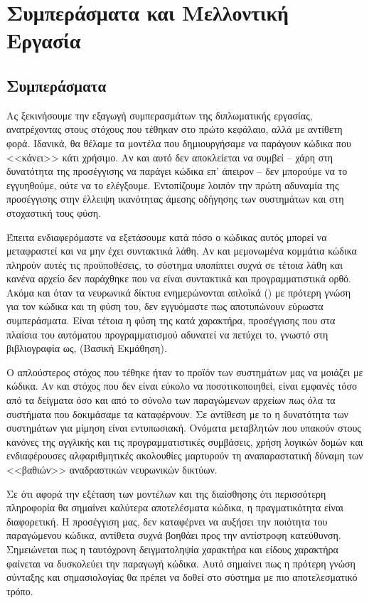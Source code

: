 \chapter{Συμπεράσματα και Μελλοντική Εργασία}

\section{Συμπεράσματα}

Ας ξεκινήσουμε την εξαγωγή συμπερασμάτων της διπλωματικής εργασίας, ανατρέχοντας στους στόχους που τέθηκαν στο πρώτο κεφάλαιο, αλλά με αντίθετη φορά.
Ιδανικά, θα θέλαμε τα μοντέλα που δημιουργήσαμε να παράγουν κώδικα που <<κάνει>> κάτι χρήσιμο. Αν και αυτό δεν αποκλείεται να συμβεί -- χάρη στη δυνατότητα της προσέγγισης να παράγει κώδικα  επ' άπειρον -- δεν μπορούμε να το εγγυηθούμε, ούτε να το ελέγξουμε.
Εντοπίζουμε λοιπόν την πρώτη αδυναμία της προσέγγισης στην έλλειψη ικανότητας άμεσης οδήγησης των συστημάτων και στη στοχαστική τους φύση.

Έπειτα ενδιαφερόμαστε να εξετάσουμε κατά πόσο ο κώδικας αυτός μπορεί να μεταφραστεί και να μην έχει συντακτικά λάθη.
Αν και μεμονωμένα κομμάτια κώδικα πληρούν αυτές τις προϋποθέσεις, το σύστημα υποπίπτει συχνά σε τέτοια λάθη και κανένα αρχείο δεν παράχθηκε που να είναι συντακτικά και προγραμματιστικά ορθό. 
Ακόμα και όταν τα νευρωνικά δίκτυα ενημερώνονται απλοϊκά () με πρότερη γνώση για τον κώδικα και τη φύση του, δεν εγγυόμαστε πως αποτυπώνουν εύρωστα συμπεράσματα.
Είναι τέτοια η φύση της κατά χαρακτήρα,  προσέγγισης που στα πλαίσια του αυτόματου προγραμματισμού αδυνατεί να πετύχει το, γνωστό στη βιβλιογραφία ως, (Βασική Εκμάθηση).

Ο απλούστερος στόχος που τέθηκε ήταν το προϊόν των συστημάτων μας να μοιάζει με κώδικα. Αν και στόχος που δεν είναι εύκολο να ποσοτικοποιηθεί, είναι εμφανές τόσο από τα δείγματα όσο και από το σύνολο των παραγώμενων αρχείων πως όλα τα συστήματα που δοκιμάσαμε τα καταφέρνουν. 
Σε αντίθεση με το  η δυνατότητα των συστημάτων για μίμηση είναι εντυπωσιακή.
Ονόματα μεταβλητών που υπακούν στους κανόνες της αγγλικής και τις προγραμματιστικές συμβάσεις, χρήση λογικών δομών και ενδιαφέρουσες αλφαριθμητικές ακολουθίες μαρτυρούν τη αναπαραστατική δύναμη των <<βαθιών>> αναδραστικών νευρωνικών δικτύων.

Σε ότι αφορά την εξέταση των  μοντέλων και της διαίσθησης ότι περισσότερη πληροφορία θα σημαίνει καλύτερα αποτελέσματα κώδικα, η πραγματικότητα είναι διαφορετική.
Η προσέγγιση μας, δεν καταφέρνει να αυξήσει την ποιότητα του παραγώμενου κώδικα, αντίθετα συχνά βοηθάει προς την αντίστροφη κατεύθυνση.
Σημειώνεται πως η ταυτόχρονη δειγματοληψία χαρακτήρα και είδους χαρακτήρα φαίνεται να δυσκολεύει την παραγωγή κώδικα.
Αυτό σημαίνει πως η πρότερη γνώση σύνταξης και σημασιολογίας  θα πρέπει να δοθεί στο σύστημα με πιο αποτελεσματικό τρόπο.

